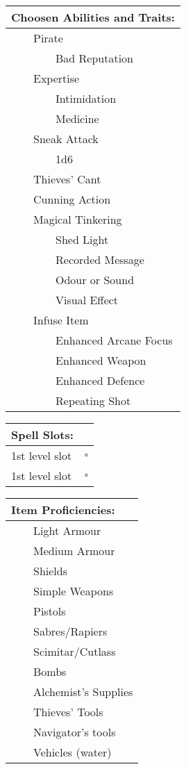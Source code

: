 \documentclass[11pt]{article}
\newcommand{\available}{$\square$}
\newcommand{\tabitem}{~~\llap{--}~~}
\newcommand{\tabtabitem}{~~~~~~\llap{$\bullet$}~~}
\begin{document}
\begin{multicols}{2}
\vspace{4mm}

\noindent \begin{tabularx}{95mm}{@{}l}
{\Large \textbf{Choosen Abilities and Traits:}} \\
\hline
\tabitem Pirate \\
\tabtabitem Bad Reputation \\
\tabitem Expertise \\
\tabtabitem Intimidation \\
\tabtabitem Medicine \\
\tabitem Sneak Attack \\
\tabtabitem 1d6 \\
\tabitem Thieves' Cant \\
\tabitem Cunning Action \\
\tabitem Magical Tinkering \\
\tabtabitem Shed Light \\
\tabtabitem Recorded Message \\
\tabtabitem Odour or Sound \\
\tabtabitem Visual Effect \\
\tabitem Infuse Item \\
\tabtabitem Enhanced Arcane Focus \\
\tabtabitem Enhanced Weapon \\
\tabtabitem Enhanced Defence \\
\tabtabitem Repeating Shot
		\end{tabularx}

\vspace{4mm}

\noindent \begin{tabularx}{95mm}{@{}l c}
{\Large \textbf{Spell Slots:}} \\
\hline
1st level slot & \available \\
1st level slot & \available
		\end{tabularx}

\vspace{4mm}

\noindent \begin{tabularx}{95mm}{@{}l}
{\Large \textbf{Item Proficiencies:}} \\
\hline
\tabitem Light Armour \\
\tabitem Medium Armour \\
\tabitem Shields \\
\tabitem Simple Weapons \\
\tabitem Pistols \\
\tabitem Sabres/Rapiers \\
\tabitem Scimitar/Cutlass \\
\tabitem Bombs \\
\tabitem Alchemist's Supplies \\
\tabitem Thieves' Tools \\
\tabitem Navigator's tools \\
\tabitem Vehicles (water)
		\end{tabularx}
	\end{multicols}
\end{document}
